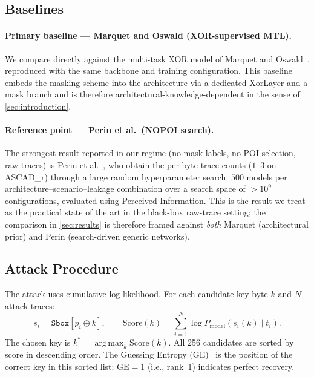 \documentclass[runningheads]{llncs}
\newcommand{\GE}{\mathrm{GE}}
\newcommand{\Sbox}{\mathtt{Sbox}}
\DeclareMathOperator*{\argmax}{arg\,max}
\begin{document}
\subsection{Baselines}

\paragraph{Primary baseline --- Marquet and Oswald (XOR-supervised MTL).}
We compare directly against the multi-task XOR model of Marquet and Oswald~\cite{marquet2024exploring}, reproduced with the same backbone and training configuration.
This baseline embeds the masking scheme into the architecture via a dedicated XorLayer and a mask branch and is therefore architectural-knowledge-dependent in the sense of \cref{sec:introduction}.

\paragraph{Reference point --- Perin et al.\ (NOPOI search).}
The strongest result reported in our regime (no mask labels, no POI selection, raw traces) is Perin et al.~\cite{perin2022exploring}, who obtain the per-byte trace counts ($1$--$3$ on ASCAD\_r) through a large random hyperparameter search: $500$ models per architecture--scenario--leakage combination over a search space of $>10^9$ configurations, evaluated using Perceived Information.
This is the result we treat as the practical state of the art in the black-box raw-trace setting; the comparison in \cref{sec:results} is therefore framed against \emph{both} Marquet (architectural prior) and Perin (search-driven generic networks).

\subsection{Attack Procedure}

The attack uses cumulative log-likelihood.
For each candidate key byte $k$ and $N$ attack traces:
\begin{equation}\label{eq:score}
  s_i = \Sbox[p_i \oplus k], \qquad
  \text{Score}(k) = \sum_{i=1}^{N} \log P_{\text{model}}(s_i(k) \mid t_i).
\end{equation}
The chosen key is $k^* = \argmax_{k} \text{Score}(k)$.
All 256 candidates are sorted by score in descending order.
The Guessing Entropy (GE)~\cite{standaert2009unified} is the position of the correct key in this sorted list; $\GE = 1$ (i.e., rank~1) indicates perfect recovery.
\end{document}
